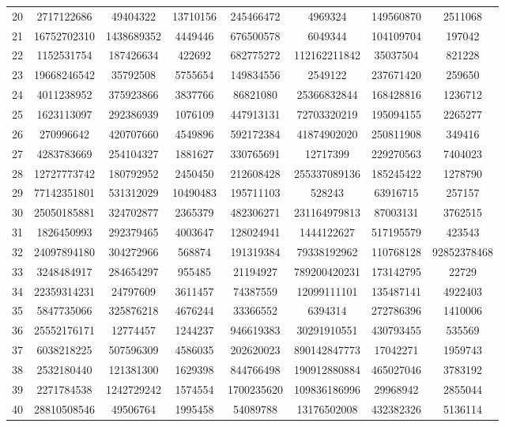 \documentclass[solution, letterpaper]{cs121}
\begin{document}
\begin{center}
\begin{tabular}{ c |c c c c c c c}
20 & 2717122686 & 49404322 & 13710156 & 245466472 & 4969324 & 149560870 & 2511068 \\
21 & 16752702310 & 1438689352 & 4449446 & 676500578 & 6049344 & 104109704 & 197042 \\
22 & 1152531754 & 187426634 & 422692 & 682775272 & 112162211842 & 35037504 & 821228 \\
23 & 19668246542 & 35792508 & 5755654 & 149834556 & 2549122 & 237671420 & 259650 \\
24 & 4011238952 & 375923866 & 3837766 & 86821080 & 25366832844 & 168428816 & 1236712 \\
25 & 1623113097 & 292386939 & 1076109 & 447913131 & 72703320219 & 195094155 & 2265277 \\
26 & 270996642 & 420707660 & 4549896 & 592172384 & 41874902020 & 250811908 & 349416 \\
27 & 4283783669 & 254104327 & 1881627 & 330765691 & 12717399 & 229270563 & 7404023 \\
28 & 12727773742 & 180792952 & 2450450 & 212608428 & 255337089136 & 185245422 & 1278790 \\
29 & 77142351801 & 531312029 & 10490483 & 195711103 & 528243 & 63916715 & 257157 \\
30 & 25050185881 & 324702877 & 2365379 & 482306271 & 231164979813 & 87003131 & 3762515 \\
31 & 1826450993 & 292379465 & 4003647 & 128024941 & 1444122627 & 517195579 & 423543 \\
32 & 24097894180 & 304272966 & 568874 & 191319384 & 79338192962 & 110768128 & 92852378468 \\
33 & 3248484917 & 284654297 & 955485 & 21194927 & 789200420231 & 173142795 & 22729 \\
34 & 22359314231 & 24797609 & 3611457 & 74387559 & 12099111101 & 135487141 & 4922403 \\
35 & 5847735066 & 325876218 & 4676244 & 33366552 & 6394314 & 272786396 & 1410006 \\
36 & 25552176171 & 12774457 & 1244237 & 946619383 & 30291910551 & 430793455 & 535569 \\
37 & 6038218225 & 507596309 & 4586035 & 202620023 & 890142847773 & 17042271 & 1959743 \\
38 & 2532180440 & 121381300 & 1629398 & 844766498 & 190912880884 & 465027046 & 3783192 \\
39 & 2271784538 & 1242729242 & 1574554 & 1700235620 & 109836186996 & 29968942 & 2855044 \\
40 & 28810508546 & 49506764 & 1995458 & 54089788 & 13176502008 & 432382326 & 5136114 \\

\end{tabular}
\end{center}
\end{document}
